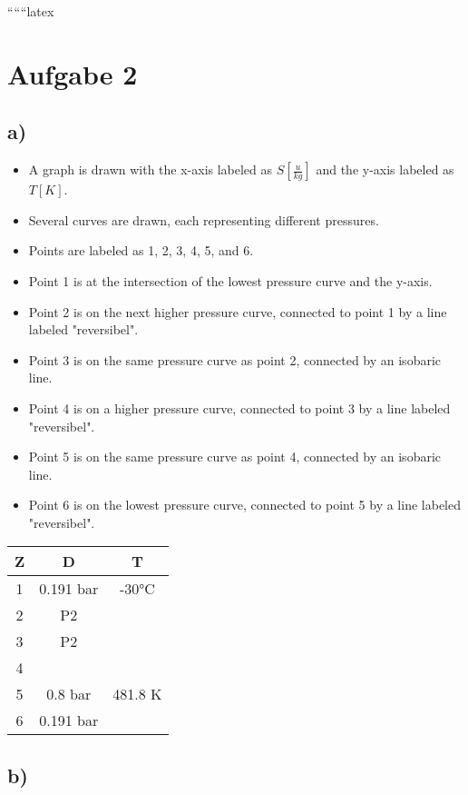 
``````latex


\section*{Aufgabe 2}

\subsection*{a)}

\begin{itemize}
    \item A graph is drawn with the x-axis labeled as $S \left[ \frac{u}{kg} \right]$ and the y-axis labeled as $T \left[ K \right]$.
    \item Several curves are drawn, each representing different pressures.
    \item Points are labeled as 1, 2, 3, 4, 5, and 6.
    \item Point 1 is at the intersection of the lowest pressure curve and the y-axis.
    \item Point 2 is on the next higher pressure curve, connected to point 1 by a line labeled "reversibel".
    \item Point 3 is on the same pressure curve as point 2, connected by an isobaric line.
    \item Point 4 is on a higher pressure curve, connected to point 3 by a line labeled "reversibel".
    \item Point 5 is on the same pressure curve as point 4, connected by an isobaric line.
    \item Point 6 is on the lowest pressure curve, connected to point 5 by a line labeled "reversibel".
\end{itemize}

\begin{tabular}{|c|c|c|}
    \hline
    Z & D & T \\
    \hline
    1 & 0.191 bar & -30°C \\
    2 & P2 & \\
    3 & P2 & \\
    4 & & \\
    5 & 0.8 bar & 481.8 K \\
    6 & 0.191 bar & \\
    \hline
\end{tabular}

\subsection*{b)}

